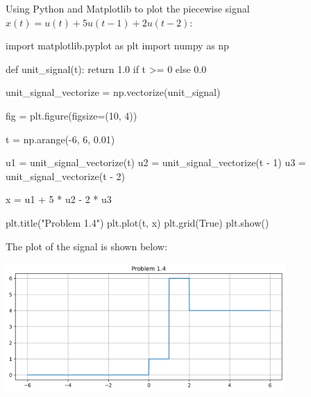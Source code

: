 \documentclass[a4paper, 10pt]{article}
\begin{document}
\begin{solution}
Using Python and Matplotlib to plot the piecewise signal \( x(t) = u(t) + 5u(t - 1) + 2u(t - 2) \):
\begin{codingbox}
import matplotlib.pyplot as plt
import numpy as np

def unit_signal(t):
    return 1.0 if t >= 0 else 0.0

unit_signal_vectorize = np.vectorize(unit_signal)

fig = plt.figure(figsize=(10, 4))

t = np.arange(-6, 6, 0.01)

u1 = unit_signal_vectorize(t)
u2 = unit_signal_vectorize(t - 1)
u3 = unit_signal_vectorize(t - 2)

x = u1 + 5 * u2 - 2 * u3

plt.title("Problem 1.4")
plt.plot(t, x)
plt.grid(True)
plt.show()
\end{codingbox}

The plot of the signal is shown below:
\begin{center}
    \includegraphics[width=0.8\textwidth]{images/problem_1_4.png}
\end{center}
\end{solution}

\newpage
\end{document}
